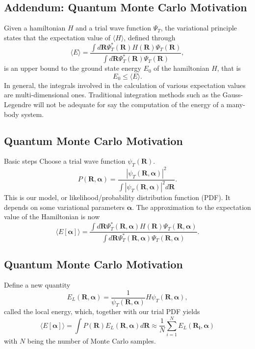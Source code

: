\documentclass[%
oneside,                 %
final,                   %
10pt]{article}
\begin{document}
\subsection{Addendum: Quantum Monte Carlo Motivation}
\begin{block}{}
Given a hamiltonian $H$ and a trial wave function $\Psi_T$, the variational principle states that the expectation value of $\langle H \rangle$, defined through 
\[
   \langle E \rangle =
   \frac{\int d\bm{R}\Psi^{\ast}_T(\bm{R})H(\bm{R})\Psi_T(\bm{R})}
        {\int d\bm{R}\Psi^{\ast}_T(\bm{R})\Psi_T(\bm{R})},
\]
is an upper bound to the ground state energy $E_0$ of the hamiltonian $H$, that is 
\[
    E_0 \le \langle E \rangle.
\]
In general, the integrals involved in the calculation of various  expectation values  are multi-dimensional ones. Traditional integration methods such as the Gauss-Legendre will not be adequate for say the  computation of the energy of a many-body system.
\end{block}

\subsection{Quantum Monte Carlo Motivation}
\begin{block}{Basic steps }
Choose a trial wave function
$\psi_T(\bm{R})$.
\[
   P(\bm{R},\bm{\alpha})= \frac{\left|\psi_T(\bm{R},\bm{\alpha})\right|^2}{\int \left|\psi_T(\bm{R},\bm{\alpha})\right|^2d\bm{R}}.
\]
This is our model, or likelihood/probability distribution function  (PDF). It depends on some variational parameters $\bm{\alpha}$.
The approximation to the expectation value of the Hamiltonian is now 
\[
   \langle E[\bm{\alpha}] \rangle = 
   \frac{\int d\bm{R}\Psi^{\ast}_T(\bm{R},\bm{\alpha})H(\bm{R})\Psi_T(\bm{R},\bm{\alpha})}
        {\int d\bm{R}\Psi^{\ast}_T(\bm{R},\bm{\alpha})\Psi_T(\bm{R},\bm{\alpha})}.
\]
\end{block}

\subsection{Quantum Monte Carlo Motivation}
\begin{block}{Define a new quantity }
\[
   E_L(\bm{R},\bm{\alpha})=\frac{1}{\psi_T(\bm{R},\bm{\alpha})}H\psi_T(\bm{R},\bm{\alpha}),
\]
called the local energy, which, together with our trial PDF yields
\[
  \langle E[\bm{\alpha}] \rangle=\int P(\bm{R})E_L(\bm{R},\bm{\alpha}) d\bm{R}\approx \frac{1}{N}\sum_{i=1}^NE_L(\bm{R_i},\bm{\alpha})
\]
with $N$ being the number of Monte Carlo samples.
\end{block}
\end{document}
